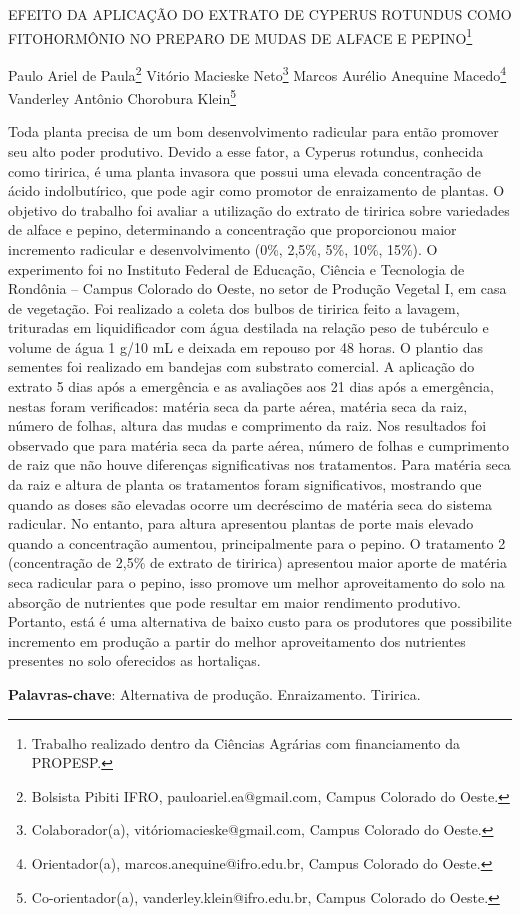 \documentclass[article,12pt,onesidea,4paper,english,brazil]{abntex2}
\begin{document}
	
	
	\frenchspacing 
	
	\begin{center}
		\LARGE EFEITO DA APLICAÇÃO DO EXTRATO DE CYPERUS ROTUNDUS COMO
		FITOHORMÔNIO NO PREPARO DE MUDAS DE ALFACE E PEPINO\footnote{Trabalho realizado dentro da Ciências Agrárias com financiamento da PROPESP.}
		
		\normalsize
		Paulo Ariel de Paula\footnote{Bolsista Pibiti IFRO, pauloariel.ea@gmail.com, Campus Colorado do Oeste.} 
		Vitório Macieske Neto\footnote{Colaborador(a), vitóriomacieske@gmail.com, Campus Colorado do Oeste.} 
		Marcos Aurélio Anequine Macedo\footnote{Orientador(a), marcos.anequine@ifro.edu.br, Campus Colorado do Oeste.} 
		Vanderley Antônio Chorobura Klein\footnote{Co-orientador(a), vanderley.klein@ifro.edu.br, Campus Colorado do Oeste.} 
	\end{center}
	
	\noindent Toda planta precisa de um bom desenvolvimento radicular para então promover seu
	alto poder produtivo. Devido a esse fator, a Cyperus rotundus, conhecida como
	tiririca, é uma planta invasora que possui uma elevada concentração de ácido
	indolbutírico, que pode agir como promotor de enraizamento de plantas. O objetivo
	do trabalho foi avaliar a utilização do extrato de tiririca sobre variedades de alface e
	pepino, determinando a concentração que proporcionou maior incremento radicular
	e desenvolvimento (0\%, 2,5\%, 5\%, 10\%, 15\%). O experimento foi no Instituto
	Federal de Educação, Ciência e Tecnologia de Rondônia – Campus Colorado do
	Oeste, no setor de Produção Vegetal I, em casa de vegetação. Foi realizado a coleta
	dos bulbos de tiririca feito a lavagem, trituradas em liquidificador com água destilada
	na relação peso de tubérculo e volume de água 1 g/10 mL e deixada em repouso por
	48 horas. O plantio das sementes foi realizado em bandejas com substrato
	comercial. A aplicação do extrato 5 dias após a emergência e as avaliações aos 21
	dias após a emergência, nestas foram verificados: matéria seca da parte aérea,
	matéria seca da raiz, número de folhas, altura das mudas e comprimento da raiz.
	Nos resultados foi observado que para matéria seca da parte aérea, número de
	folhas e cumprimento de raiz que não houve diferenças significativas nos
	tratamentos. Para matéria seca da raiz e altura de planta os tratamentos foram
	significativos, mostrando que quando as doses são elevadas ocorre um decréscimo
	de matéria seca do sistema radicular. No entanto, para altura apresentou plantas de
	porte mais elevado quando a concentração aumentou, principalmente para o pepino.
	O tratamento 2 (concentração de 2,5\% de extrato de tiririca) apresentou maior
	aporte de matéria seca radicular para o pepino, isso promove um melhor
	aproveitamento do solo na absorção de nutrientes que pode resultar em maior
	rendimento produtivo. Portanto, está é uma alternativa de baixo custo para os
	produtores que possibilite incremento em produção a partir do melhor
	aproveitamento dos nutrientes presentes no solo oferecidos as hortaliças.
	
	\vspace{\onelineskip}
	
	\noindent
	\textbf{Palavras-chave}: Alternativa de produção. Enraizamento. Tiririca.
	
\end{document}
